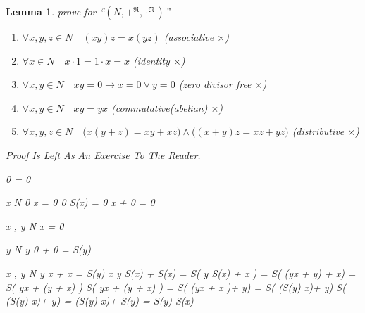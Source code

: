 \documentclass[10pt,a4paper]{book}
\newtheorem{lemma}{Lemma}[section]
\begin{document}
\begin{lemma}prove for ``$(N , +^{\mathfrak{N}} , \cdot^{\mathfrak{N}})$''
    \begin{enumerate}
        \setlength{\itemsep}{0pt} %
        \item       $\forall x , y , z  \in N \quad (x y) z  = x (y z)  $ (associative $\times$)
        \item       $\forall x  \in N \quad x  \cdot 1 = 1 \cdot x  = x $ (identity  $\times$)
        \item       $\forall x  , y    \in N \quad   x   y  = 0   \to  x  = 0  \lor   y  = 0 $ (zero divisor free $\times$)
        \item       $\forall x , y  \in N \quad x y = y x$ (commutative(abelian)  $\times$)
        \item       $\forall x  , y  , z   \in N \quad \Big(x    ( y   +  z  ) = x     y   +  x     z   \Big)
                  \land     \Big((x   +  y  )   z   = x     z   +   y     z   \Big)  $ (distributive $\times$)
    \end{enumerate}
    Proof Is Left As An Exercise To The Reader.

    \begin{fitchproof}[arrayenv=tabular]

         {  0   = 0  }                 

        \open
         { x   \in N }   
        \open
         { 0 \cdot  x =  0 }     
         { 0 \cdot  S(x) = 0 \cdot x + 0 =  0 }
        \close

        \close
         {\forall x , y \in N  \cdot  x =  0  }     

    \end{fitchproof}

    \begin{fitchproof}[arrayenv=tabular]
        
        \open
         {  y   \in N }   
         {   y 0 + 0 = S(y)   }                 

        \open
         { x , y   \in N }   
        \open
         {  y x + x = S(y) \cdot x }     
         {   y \cdot S(x) + S(x)  = S(   y \cdot S(x)  + x ) = S( (yx + y) + x) = S( yx + (y + x) ) }
         { S( yx + (y + x) ) = S( (yx + x )+ y)  =  S( (S(y) \cdot x)+ y) }
         {   S( (S(y) \cdot x)+ y) =  (S(y) \cdot x)+ S(y) = S(y) \cdot S(x) }
        \close
        \close
        

\end{fitchproof}
\end{lemma}
\end{document}
